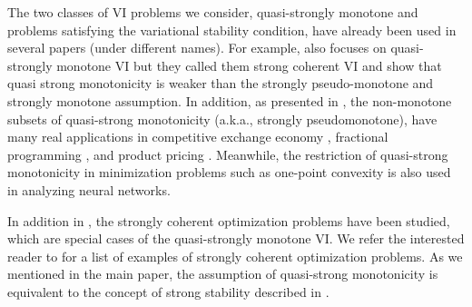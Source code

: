 \documentclass{article}
\begin{document}
The two classes of VI problems we consider, quasi-strongly monotone and problems satisfying the variational stability condition, have already been used in several papers (under different names). For example, \cite{song2020optimistic} also focuses on quasi-strongly monotone VI but they called them strong coherent VI and show that quasi strong monotonicity is weaker than the strongly pseudo-monotone \citep{kannan2019optimal} and strongly monotone assumption. In addition, as presented in \cite{song2020optimistic}, the non-monotone subsets of quasi-strong monotonicity (a.k.a., strongly pseudomonotone), have many real applications in competitive exchange economy \citep{brighi2002characterizations}, fractional programming \citep{elizarov2009maximization,rousseau2005trade}, and product pricing \citep{choi1990product}. Meanwhile, the restriction of quasi-strong monotonicity in minimization problems such as one-point convexity \citep{li2017convergence} is also used in analyzing neural networks.

In addition in \cite{zhou2017stochastic}, the strongly coherent optimization problems have been studied, which are special cases of the quasi-strongly monotone VI. We refer the interested reader to \cite{zhou2017stochastic} for a list of examples of strongly coherent optimization problems. As we mentioned in the main paper, the assumption of quasi-strong monotonicity is equivalent to the concept of strong stability described in \cite{mertikopoulos2019games}.
\end{document}
